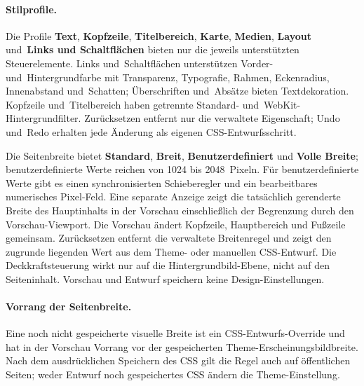 \documentclass[11pt,a4paper]{article}
\newcommand{\ui}[1]{\textbf{#1}}
\begin{document}
\paragraph{Stilprofile.} Die Profile \ui{Text}, \ui{Kopfzeile},
\ui{Titelbereich}, \ui{Karte}, \ui{Medien}, \ui{Layout} und~\ui{Links und
Schaltflächen} bieten nur die jeweils unterstützten Steuerelemente. Links
und~Schaltflächen unterstützen Vorder- und~Hintergrundfarbe mit Transparenz,
Typografie, Rahmen, Eckenradius, Innenabstand und~Schatten; Überschriften
und~Absätze bieten Textdekoration. Kopfzeile und~Titelbereich haben getrennte
Standard- und~WebKit-Hintergrundfilter. Zurücksetzen entfernt nur die verwaltete
Eigenschaft; Undo und~Redo erhalten jede Änderung als eigenen
CSS-Entwurfsschritt.

Die Seitenbreite bietet \ui{Standard}, \ui{Breit}, \ui{Benutzerdefiniert} und
\ui{Volle Breite}; benutzerdefinierte Werte reichen von 1024 bis 2048~Pixeln.
Für benutzerdefinierte Werte gibt es einen synchronisierten Schieberegler und
ein bearbeitbares numerisches Pixel-Feld. Eine separate Anzeige zeigt die
tatsächlich gerenderte Breite des Hauptinhalts in der Vorschau einschließlich
der Begrenzung durch den Vorschau-Viewport. Die Vorschau ändert Kopfzeile,
Hauptbereich und Fußzeile gemeinsam. Zurücksetzen entfernt die verwaltete
Breitenregel und zeigt den zugrunde liegenden Wert aus dem Theme- oder manuellen
CSS-Entwurf. Die Deckkraftsteuerung wirkt nur auf die Hintergrundbild-Ebene,
nicht auf den Seiteninhalt. Vorschau und Entwurf speichern keine
Design-Einstellungen.
\paragraph{Vorrang der Seitenbreite.} Eine noch nicht gespeicherte visuelle
Breite ist ein CSS-Entwurfs-Override und hat in der Vorschau Vorrang vor der
gespeicherten Theme-Erscheinungsbildbreite. Nach dem ausdrücklichen Speichern
des CSS gilt die Regel auch auf öffentlichen Seiten; weder Entwurf noch
gespeichertes CSS ändern die Theme-Einstellung.
\end{document}
